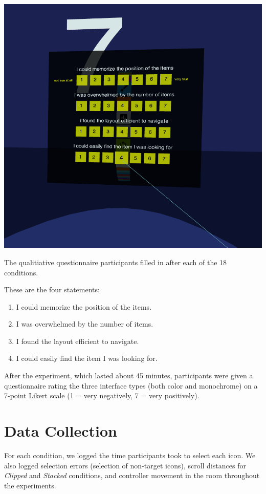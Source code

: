 \documentclass[nobib]{tufte-book} %
\begin{document}
\begin{marginfigure}
  \includegraphics{questionnaire.png}
  \caption{The qualitiative questionnaire participants filled in after each of the 18 conditions.}
  \label{fig:questionnaire}
\end{marginfigure}

These are the four statements:

\begin{enumerate}[label=\arabic*. , wide=0.5em,  leftmargin=*]
  \item I could memorize the position of the items.
  \item I was overwhelmed by the number of items.
  \item I found the layout efficient to navigate.
  \item I could easily find the item I was looking for.
\end{enumerate}


After the experiment, which lasted about 45 minutes, participants were given a questionnaire rating the three interface types (both color and monochrome) on a 7-point Likert scale (1 = very negatively, 7 = very positively).

\section{Data Collection}
For each condition, we logged the time participants took to select each icon. We also logged selection errors (selection of non-target icons), scroll distances for \emph{Clipped} and \emph{Stacked} conditions, and controller movement in the room throughout the experiments.
\end{document}
